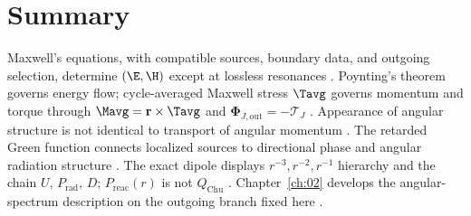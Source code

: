 \section{Summary}
\label{sec:ch01.7}

Maxwell's equations, with compatible sources, boundary data, and outgoing selection, determine \((\E,\H)\) except at lossless resonances \cite{maxwell1873,stratton1941}. Poynting's theorem governs energy flow; cycle-averaged Maxwell stress $\Tavg$ governs momentum and torque through $\Mavg=\mathbf{r}\times\Tavg$ and $\boldsymbol{\Phi}_{J,\mathrm{out}}=-\boldsymbol{\mathcal{T}}_J$ \cite{poynting1884,beth1936}. Appearance of angular structure is not identical to transport of angular momentum \cite{allen1992}. The retarded Green function connects localized sources to directional phase and angular radiation structure \cite{tai1994}. The exact dipole displays $r^{-3},r^{-2},r^{-1}$ hierarchy and the chain $U$, $P_{\mathrm{rad}}$, $D$; $P_{\mathrm{reac}}(r)$ is not $Q_{\mathrm{Chu}}$ \cite{stratton1941,chu1948}. Chapter~\ref{ch:02} develops the angular-spectrum description on the outgoing branch fixed here \cite{harrington2001}.

\label{sec:ch01.7.1}
\label{eq:ch1.continuity-admissibility}%
\label{eq:ch1.continuity-charge-continuous}%
\label{eq:ch1.master-admissibility-chain}%
\label{eq:ch1.master-charge-continuous-chain}%
\label{eq:ch1.report-class-lock}%
\label{sec:ch01.7.2}
\label{sec:ch01.7.3}
\label{eq:ch1.bridge-compatibility-criteria}%
\label{eq:ch1.compatibility-criteria}%

